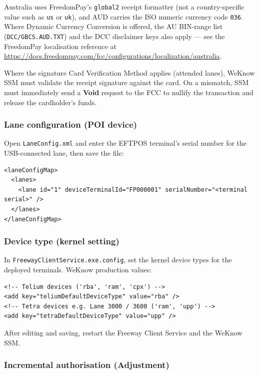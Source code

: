 \documentclass[a4paper,10pt]{article}
\begin{document}
Australia uses FreedomPay's \texttt{global2} receipt formatter (not a
country-specific value such as \texttt{us} or \texttt{uk}), and AUD carries
the ISO numeric currency code \texttt{036}. Where Dynamic Currency
Conversion is offered, the AU BIN-range list
(\texttt{DCC/GBCS.AUD.TXT}) and the DCC disclaimer keys also apply ---
see the FreedomPay localisation reference at
\url{https://docs.freedompay.com/fcc/configurations/localization/australia}.

\begin{wkwarn}
Where the signature Card Verification Method applies (attended lanes),
WeKnow SSM must validate the receipt signature against the card. On a
mismatch, SSM must immediately send a \textbf{Void} request to the FCC to
nullify the transaction and release the cardholder's funds.
\end{wkwarn}

\subsubsection{Lane configuration (POI device)}

Open \texttt{LaneConfig.xml} and enter the EFTPOS terminal's serial
number for the USB-connected lane, then save the file:

\begin{lstlisting}
<laneConfigMap>
  <lanes>
    <lane id="1" deviceTerminalId="FP000001" serialNumber="<terminal serial>" />
  </lanes>
</laneConfigMap>
\end{lstlisting}

\subsubsection{Device type (kernel setting)}

In \texttt{FreewayClientService.exe.config}, set the kernel device types
for the deployed terminals. WeKnow production values:

\begin{lstlisting}
<!-- Telium devices ('rba', 'ram', 'cpx') -->
<add key="teliumDefaultDeviceType" value="rba" />
<!-- Tetra devices e.g. Lane 3000 / 3600 ('ram', 'upp') -->
<add key="tetraDefaultDeviceType" value="upp" />
\end{lstlisting}

After editing and saving, restart the Freeway Client Service and the
WeKnow SSM.

\subsubsection{Incremental authorisation (Adjustment)}\label{sec:incremental}
\end{document}
